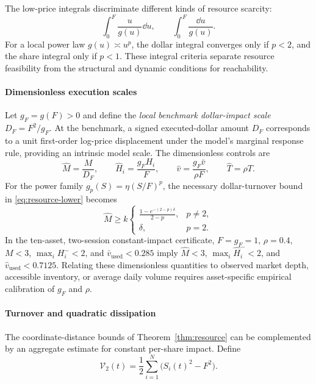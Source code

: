 \documentclass[review,hidelinks,onefignum,onetabnum]{siamonline250211}
\begin{document}
The low-price integrals discriminate different kinds of resource scarcity:
\begin{equation}\label{eq:lowprice}
\int_0^F\frac{u}{g(u)}\dd u,\qquad
\int_0^F\frac{\dd u}{g(u)}.
\end{equation}
For a local power law $g(u)\asymp u^p$, the dollar integral converges only if $p<2$, and the share integral only if $p<1$. These integral criteria separate resource feasibility from the structural and dynamic conditions for reachability.

\paragraph{Dimensionless execution scales}
Let $g_F=g(F)>0$ and define the \emph{local benchmark dollar-impact scale} $D_F=F^2/g_F$. At the benchmark, a signed executed-dollar amount $D_F$ corresponds to a unit first-order log-price displacement under the model's marginal response rule, providing an intrinsic model scale. The dimensionless controls are
\[
\widehat M=\frac{M}{D_F},\qquad
\widehat H_i=\frac{g_F H_i}{F},\qquad
\widehat v=\frac{g_F\bar v}{\rho F},\qquad
\widehat T=\rho T.
\]
For the power family $g_p(S)=\eta(S/F)^p$, the necessary dollar-turnover bound in \eqref{eq:resource-lower} becomes
\[
\widehat M\ge k\begin{cases}
\displaystyle\frac{1-e^{-(2-p)\delta}}{2-p},&p\ne2,\\[4pt]
\delta,&p=2.
\end{cases}
\]
In the ten-asset, two-session constant-impact certificate, $F=g_F=1$, $\rho=0.4$, $M<3$, $\max_iH_i^-<2$, and $\bar v_{\mathrm{used}}<0.285$ imply $\widehat M<3$, $\max_i\widehat H_i^-<2$, and $\widehat v_{\mathrm{used}}<0.7125$. Relating these dimensionless quantities to observed market depth, accessible inventory, or average daily volume requires asset-specific empirical calibration of $g_F$ and $\rho$.



\paragraph{Turnover and quadratic dissipation}
The coordinate-distance bounds of Theorem~\ref{thm:resource} can be complemented
by an aggregate estimate for constant per-share impact. Define
\[
\mathcal V_2(t)=\frac12\sum_{i=1}^N\bigl(S_i(t)^2-F^2\bigr).
\]
\end{document}
